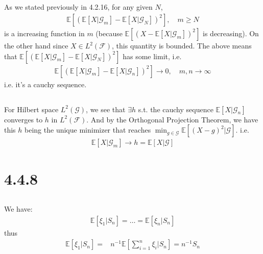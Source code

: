\documentclass[11pt,a4paper]{ctexart}
\numberwithin{equation}{section}%
\begin{document}
\subsection{}
As we stated previously in 4.2.16, for any given $ N $, 
\begin{align*}
    \mathbb{E}\left[ (\mathbb{E}\left[ X| \mathcal{G}_m \right] -\mathbb{E}\left[ X| \mathcal{G}_N \right] )^2 \right] ,\quad m\geq N
\end{align*}
is a increasing function in $ m $ (because $ \mathbb{E}\left[ (X-\mathbb{E}\left[ X| \mathcal{G}_m \right])^2 \right]  $ is decreasing). On the other hand since $ X\in L^2(\mathcal{F}) $, this quantity is bounded. The above means that $ \mathbb{E}\left[ (\mathbb{E}\left[ X| \mathcal{G}_m \right] -\mathbb{E}\left[ X| \mathcal{G}_N \right] )^2 \right] $ has some limit, i.e.
\begin{align*}
    \mathbb{E}\left[ (\mathbb{E}\left[ X| \mathcal{G}_m \right] -\mathbb{E}\left[ X| \mathcal{G}_n \right] )^2 \right] \to 0,\quad m,n\to \infty
\end{align*}
i.e. it's a cauchy sequence. 

\subsection{}

For Hilbert space $ L^2(\mathcal{G}) $, we see that $ \exists h $ s.t. the cauchy sequence $ \mathbb{E}\left[ X| \mathcal{G}_n \right]  $ converges to $ h $ in $ L^2(\mathcal{F}) $. And by the Orthogonal Projection Theorem, we have this $ h $ being the unique minimizer that reaches $ \min_{g\in \mathcal{G}}\mathbb{E}\left[ (X-g)^2|\mathcal{G} \right]  $. i.e. 
\begin{align*}
     \mathbb{E}\left[ X| \mathcal{G}_m \right] \to h = \mathbb{E}\left[ X| \mathcal{G} \right]
\end{align*}


\section{4.4.8}

\subsection{}
We have:
\begin{align*}
    \mathbb{E}\left[ \xi _1|S_n \right] = \ldots = \mathbb{E}\left[ \xi _n|S_n \right] 
\end{align*}
thus
\begin{align*}
    \mathbb{E}\left[ \xi _1|S_n \right] =& n^{-1}\mathbb{E}\left[ \sum_{i=1}^n \xi _i | S_n \right] = n^{-1}S_n 
\end{align*}
\end{document}
